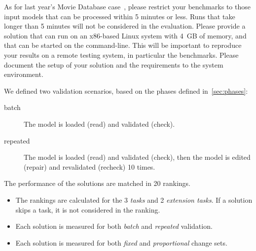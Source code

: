 \documentclass[submission,copyright,creativecommons]{eptcs}
\begin{document}
As for last year's Movie Database case~\cite{horn2014ttc}, please restrict your benchmarks to those input models that can be processed within 5 minutes or less. Runs that take longer than 5 minutes will not be considered in the evaluation. Please provide a solution that can run on an x86-based Linux system with 4~GB of memory, and that can be started on the command-line. This will be important to reproduce your results on a remote testing system, in particular the benchmarks. Please document the setup of your solution and the requirements to the system environment.

We defined two validation scenarios, based on the phases defined in~\autoref{sec:phases}:

\begin{description}
\item[batch] The model is loaded (\textsf{read}) and validated (\textsf{check}).
\item[repeated] The model is loaded (\textsf{read}) and validated (\textsf{check}), then the model is edited (\textsf{repair}) and revalidated (\textsf{recheck}) 10 times.
\end{description}

The performance of the solutions are matched in 20 rankings.

\begin{itemize}
  \item The rankings are calculated for the 3 \emph{tasks} and 2 \emph{extension tasks}. If a solution skips a task, it is not considered in the ranking.
  \item Each solution is measured for both \emph{batch} and \emph{repeated} validation.
  \item Each solution is measured for both \emph{fixed} and \emph{proportional} change sets.
\end{itemize}
\end{document}
